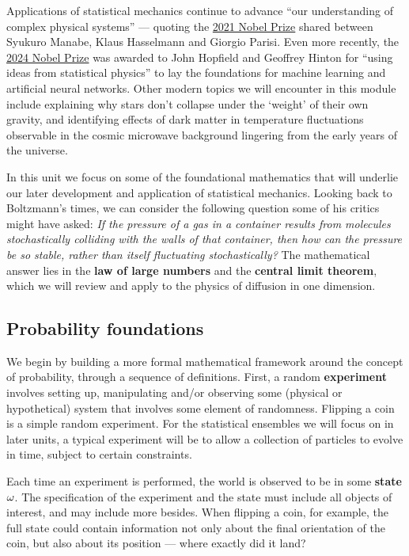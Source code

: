 Applications of statistical mechanics continue to advance ``our understanding of complex physical systems'' --- quoting the \href{https://www.nobelprize.org/prizes/physics/2021/summary/}{2021 Nobel Prize} shared between Syukuro Manabe, Klaus Hasselmann and Giorgio Parisi.
Even more recently, the \href{https://www.nobelprize.org/prizes/physics/2024/summary/}{2024 Nobel Prize} was awarded to John Hopfield and Geoffrey Hinton for ``using ideas from statistical physics'' to lay the foundations for machine learning and artificial neural networks.
Other modern topics we will encounter in this module include explaining why stars don't collapse under the `weight' of their own gravity, and identifying effects of dark matter in temperature fluctuations observable in the cosmic microwave background lingering from the early years of the universe.

In this unit we focus on some of the foundational mathematics that will underlie our later development and application of statistical mechanics.
Looking back to Boltzmann's times, we can consider the following question some of his critics might have asked:
\textit{If the pressure of a gas in a container results from molecules stochastically colliding with the walls of that container, then how can the pressure be so stable, rather than itself fluctuating stochastically?}
The mathematical answer lies in the \textbf{law of large numbers} and the \textbf{central limit theorem}, which we will review and apply to the physics of diffusion in one dimension.



\subsection{\label{sec:prob}Probability foundations}
We begin by building a more formal mathematical framework around the concept of probability, through a sequence of definitions.
%
First, a random \textbf{experiment} \cE involves setting up, manipulating and/or observing some (physical or hypothetical) system that involves some element of randomness.
Flipping a coin is a simple random experiment.
For the statistical ensembles we will focus on in later units, a typical experiment will be to allow a collection of particles to evolve in time, subject to certain constraints.

Each time an experiment is performed, the world is observed to be in some \textbf{state} $\omega$.
The specification of the experiment and the state must include all objects of interest, and may include more besides.
When flipping a coin, for example, the full state could contain information not only about the final orientation of the coin, but also about its position --- where exactly did it land?

